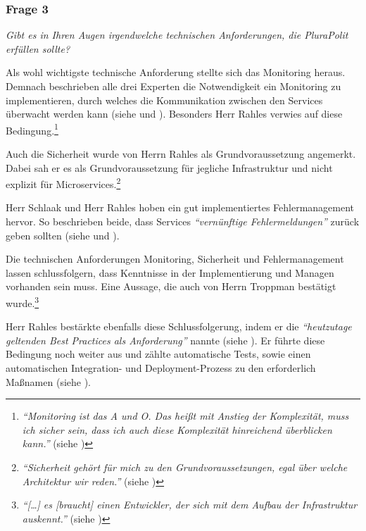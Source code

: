 \subsubsection{Frage 3}

\textit{Gibt es in Ihren Augen irgendwelche technischen Anforderungen, die PluraPolit erfüllen sollte?}

Als wohl wichtigste technische Anforderung stellte sich das Monitoring heraus. Demnach beschrieben alle drei Experten die Notwendigkeit ein Monitoring zu implementieren, durch welches die Kommunikation zwischen den Services überwacht werden kann (siehe  und ). Besonders Herr Rahles verwies auf diese Bedingung.\footnote{
\textit{\enquote{Monitoring ist das A und O. Das heißt mit Anstieg der Komplexität, muss ich sicher sein, dass ich auch diese Komplexität hinreichend überblicken kann.}} (siehe )
}

Auch die Sicherheit wurde von Herrn Rahles als Grundvoraussetzung angemerkt. Dabei sah er es als Grundvoraussetzung für jegliche Infrastruktur und nicht explizit für Microservices.\footnote{
\textit{\enquote{Sicherheit gehört für mich zu den Grundvoraussetzungen, egal über welche Architektur wir reden.}} (siehe )
}

Herr Schlaak und Herr Rahles hoben ein gut implementiertes Fehlermanagement hervor. So beschrieben beide, dass Services \textit{\enquote{vernünftige Fehlermeldungen}} zurück geben sollten (siehe  und ).

Die technischen Anforderungen Monitoring, Sicherheit und Fehlermanagement lassen schlussfolgern, dass Kenntnisse in der Implementierung und Managen vorhanden sein muss. Eine Aussage, die auch von Herrn Troppman bestätigt wurde.\footnote{
\textit{\enquote{[…] es [braucht] einen Entwickler, der sich mit dem Aufbau der Infrastruktur auskennt.}} (siehe )
}

Herr Rahles bestärkte ebenfalls diese Schlussfolgerung, indem er die \textit{\enquote{heutzutage geltenden Best Practices als Anforderung}} nannte (siehe ). Er führte diese Bedingung noch weiter aus und zählte automatische Tests, sowie einen automatischen Integration- und Deployment-Prozess zu den erforderlich Maßnamen (siehe ).


